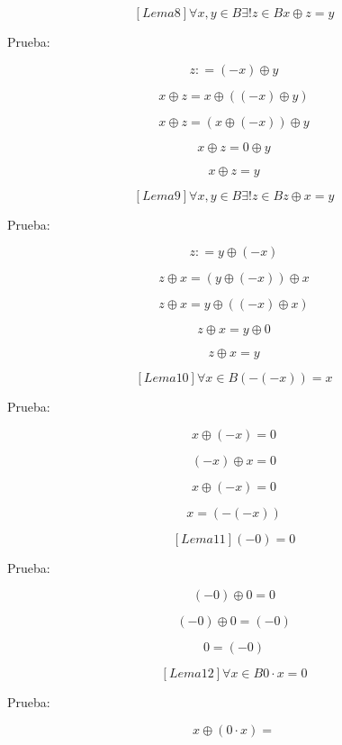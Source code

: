 \begin{enumerate}
\begin{enumerate}
\begin{enumerate}
      \[\left\lbrack {{Lema}8} \right\rbrack\forall x,{y \in B}\exists\mathtt{\mathrm{!}}{z \in B}x \oplus {z = y}\]

      Prueba:

      \[z{: = \left( {- x} \right)} \oplus y\]

      \[x \oplus {z = x} \oplus \left( {\left( {- x} \right) \oplus y} \right)\]

      \[x \oplus {z = \left( {x \oplus \left( {- x} \right)} \right)} \oplus y\]

      \[x \oplus {z = 0} \oplus y\]

      \[x \oplus {z = y}\]

      \[\left\lbrack {{Lema}9} \right\rbrack\forall x,{y \in B}\exists\mathtt{\mathrm{!}}{z \in B}z \oplus {x = y}\]

      Prueba:

      \[z{: = y} \oplus \left( {- x} \right)\]

      \[z \oplus {x = \left( {y \oplus \left( {- x} \right)} \right)} \oplus x\]

      \[z \oplus {x = y} \oplus \left( {\left( {- x} \right) \oplus x} \right)\]

      \[z \oplus {x = y} \oplus 0\]

      \[z \oplus {x = y}\]

      \[\left\lbrack {{Lema}10} \right\rbrack\forall{x \in B}{\left( {- \left( {- x} \right)} \right) = x}\]

      Prueba:

      \[x \oplus {\left( {- x} \right) = 0}\]

      \[\left( {- x} \right) \oplus {x = 0}\]

      \[x \oplus {\left( {- x} \right) = 0}\]

      \[x = \left( {- \left( {- x} \right)} \right)\]

      \[\left\lbrack {{Lema}11} \right\rbrack{\left( {- 0} \right) = 0}\]

      Prueba:

      \[\left( {- 0} \right) \oplus {0 = 0}\]

      \[\left( {- 0} \right) \oplus {0 = \left( {- 0} \right)}\]

      \[0 = \left( {- 0} \right)\]

      \[\left\lbrack {{Lema}12} \right\rbrack\forall{x \in B}{{0 \cdot x} = 0}\]

      Prueba:

      \[x \oplus {\left( {0 \cdot x} \right) =}\]


\end{enumerate}
\end{enumerate}
\end{enumerate}
